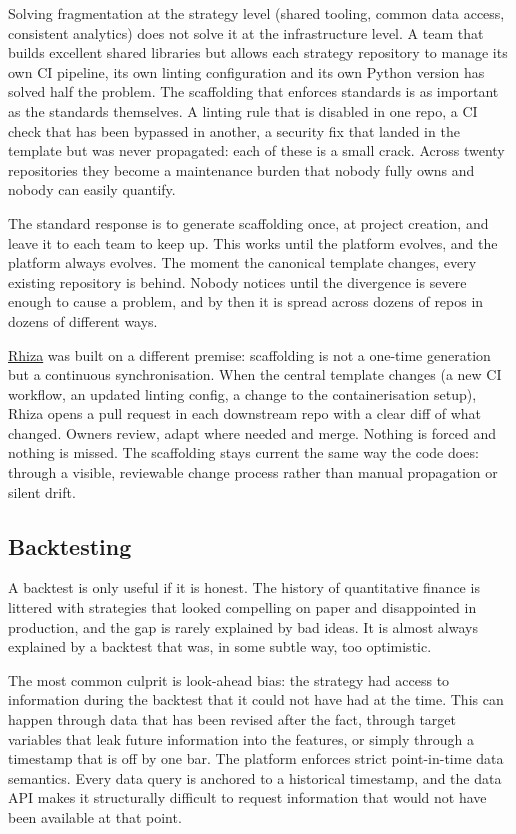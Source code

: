 \documentclass[
  11pt,
]{article}
\begin{document}
Solving fragmentation at the strategy level (shared tooling, common
data access, consistent analytics) does not solve it at the
infrastructure level. A team that builds excellent shared libraries but
allows each strategy repository to manage its own CI pipeline, its own
linting configuration and its own Python version has solved half the
problem. The scaffolding that enforces standards is as important as the
standards themselves. A linting rule that is disabled in one repo, a CI
check that has been bypassed in another, a security fix that landed in
the template but was never propagated: each of these is a small
crack. Across twenty repositories they become a maintenance burden that
nobody fully owns and nobody can easily quantify.

The standard response is to generate scaffolding once, at project
creation, and leave it to each team to keep up. This works until the
platform evolves, and the platform always evolves. The moment the
canonical template changes, every existing repository is behind. Nobody
notices until the divergence is severe enough to cause a problem, and by
then it is spread across dozens of repos in dozens of different ways.

\href{https://github.com/Jebel-Quant/rhiza}{Rhiza} was built
on a different premise: scaffolding is not a one-time generation but a
continuous synchronisation. When the central template changes (a new
CI workflow, an updated linting config, a change to the containerisation
setup), Rhiza opens a pull request in each downstream repo with a
clear diff of what changed. Owners review, adapt where needed and merge.
Nothing is forced and nothing is missed. The scaffolding stays current
the same way the code does: through a visible, reviewable change process
rather than manual propagation or silent drift.

\subsection{Backtesting}\label{backtesting}

A backtest is only useful if it is honest. The history of quantitative
finance is littered with strategies that looked compelling on paper and
disappointed in production, and the gap is rarely explained by bad
ideas. It is almost always explained by a backtest that was, in some
subtle way, too optimistic.

The most common culprit is look-ahead bias: the strategy had access to
information during the backtest that it could not have had at the time.
This can happen through data that has been revised after the fact,
through target variables that leak future information into the features,
or simply through a timestamp that is off by one bar. The platform
enforces strict point-in-time data semantics. Every data query is
anchored to a historical timestamp, and the data API makes it
structurally difficult to request information that would not have been
available at that point.
\end{document}

